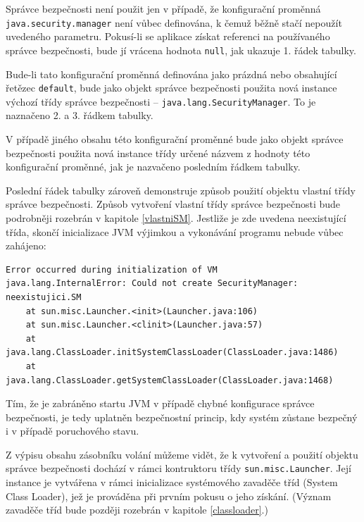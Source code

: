 Správce bezpečnosti není použit jen v případě, že konfigurační proměnná {\tt java.security.manager} není vůbec definována, k čemuž běžně stačí nepoužít uvedeného parametru. Pokusí-li se aplikace získat referenci na používaného správce bezpečnosti, bude jí vrácena hodnota {\tt null}, jak ukazuje 1. řádek tabulky.

Bude-li tato konfigurační proměnná definována jako prázdná nebo obsahující řetězec {\tt default}, bude jako objekt správce bezpečnosti použita nová instance výchozí třídy správce bezpečnosti -- {\tt java.lang.SecurityManager}. To je naznačeno 2. a 3. řádkem tabulky.

V případě jiného obsahu této konfigurační proměnné bude jako objekt správce bezpečnosti použita nová instance třídy určené názvem z hodnoty této konfigurační proměnné, jak je nazvačeno posledním řádkem tabulky.

Poslední řádek tabulky zároveň demonstruje způsob použití objektu vlastní třídy správce bezpečnosti. Způsob vytvoření vlastní třídy správce bezpečnosti bude podrobněji rozebrán v kapitole \ref{vlastniSM}. Jestliže je zde uvedena neexistující třída, skončí inicializace JVM výjimkou a vykonávání programu nebude vůbec zahájeno:

\begin{lstlisting}[caption=Vyjímka při spuštění JVM s neexistujícím správcem bezpečnosti, label=smEx]
Error occurred during initialization of VM
java.lang.InternalError: Could not create SecurityManager: neexistujici.SM
    at sun.misc.Launcher.<init>(Launcher.java:106)
    at sun.misc.Launcher.<clinit>(Launcher.java:57)
    at java.lang.ClassLoader.initSystemClassLoader(ClassLoader.java:1486)
    at java.lang.ClassLoader.getSystemClassLoader(ClassLoader.java:1468)
\end{lstlisting}

Tím, že je zabráněno startu JVM v případě chybné konfigurace správce bezpečnosti, je tedy uplatněn bezpečnostní princip, kdy systém zůstane bezpečný i v případě poruchového stavu.

Z výpisu obsahu zásobníku volání můžeme vidět, že k vytvoření a použití objektu správce bezpečnosti dochází v rámci kontruktoru třídy {\tt sun.misc.Launcher}. Její instance je vytvářena v rámci inicializace systémového zavaděče tříd (System Class Loader), jež je prováděna při prvním pokusu o jeho získání. (Význam zavaděče tříd bude později rozebrán v kapitole \ref{classloader}.)

